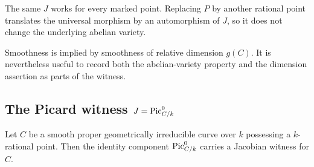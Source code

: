 \begin{remark}
  \label{rem:JacobianWitness_quantifier_order}
  The same \(J\) works for every marked point.  Replacing \(P\) by another
  rational point translates the universal morphism by an automorphism of
  \(J\), so it does not change the underlying abelian variety.
\end{remark}

\begin{remark}
  \label{rem:JacobianWitness_smooth_redundancy}
  Smoothness is implied by smoothness of relative dimension \(g(C)\).  It is
  nevertheless useful to record both the abelian-variety property and the
  dimension assertion as parts of the witness.
\end{remark}

\subsection{The Picard witness \(J=\operatorname{Pic}^0_{C/k}\)}
\label{sec:picardJacobianWitness}

\begin{theorem}
  \label{def:picardJacobianWitnessOfHasRationalPoint}
  Let \(C\) be a smooth proper geometrically irreducible curve over \(k\)
  possessing a \(k\)-rational point. Then the identity component
  \(\operatorname{Pic}^0_{C/k}\) carries a Jacobian witness for \(C\).
\end{theorem}

